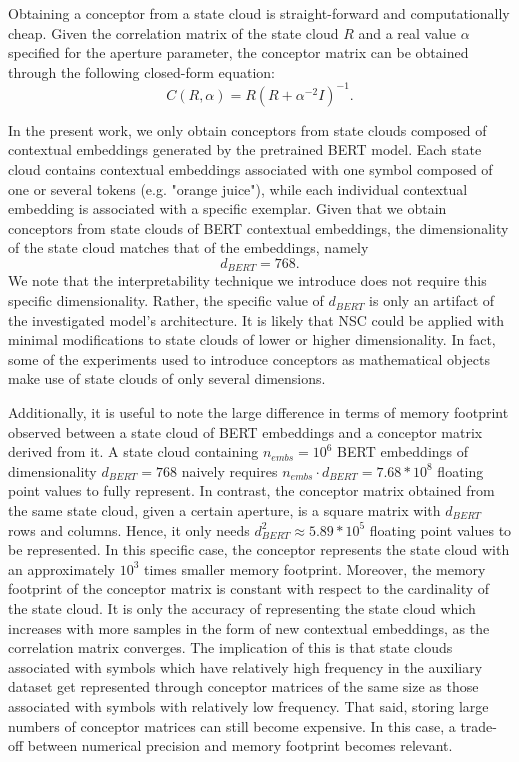 Obtaining a conceptor from a state cloud is straight-forward and computationally cheap. Given the correlation matrix of the state cloud $R$ and a real value $\alpha$ specified for the aperture parameter, the conceptor matrix can be obtained through the following closed-form equation:$$C(R, \alpha) = R (R + \alpha^{-2} I)^{-1}.$$

In the present work, we only obtain conceptors from state clouds composed of contextual embeddings generated by the pretrained BERT model. Each state cloud contains contextual embeddings associated with one symbol composed of one or several tokens (e.g. "orange juice"), while each individual contextual embedding is associated with a specific exemplar. Given that we obtain conceptors from state clouds of BERT contextual embeddings, the dimensionality of the state cloud matches that of the embeddings, namely $$d_{BERT}=768.$$ We note that the interpretability technique we introduce does not require this specific dimensionality. Rather, the specific value of $d_{BERT}$ is only an artifact of the investigated model's architecture. It is likely that NSC could be applied with minimal modifications to state clouds of lower or higher dimensionality. In fact, some of the experiments used to introduce conceptors as mathematical objects make use of state clouds of only several dimensions.

Additionally, it is useful to note the large difference in terms of memory footprint observed between a state cloud of BERT embeddings and a conceptor matrix derived from it. A state cloud containing $n_{embs} = 10^6$ BERT embeddings of dimensionality $d_{BERT}=768$ naively requires $n_{embs} \cdot d_{BERT} = 7.68 * 10^8$ floating point values to fully represent. In contrast, the conceptor matrix obtained from the same state cloud, given a certain aperture, is a square matrix with $d_{BERT}$ rows and columns. Hence, it only needs $d_{BERT}^2 \approx 5.89 * 10^5$ floating point values to be represented. In this specific case, the conceptor represents the state cloud with an approximately $10^3$ times smaller memory footprint. Moreover, the memory footprint of the conceptor matrix is constant with respect to the cardinality of the state cloud. It is only the accuracy of representing the state cloud which increases with more samples in the form of new contextual embeddings, as the correlation matrix converges. The implication of this is that state clouds associated with symbols which have relatively high frequency in the auxiliary dataset get represented through conceptor matrices of the same size as those associated with symbols with relatively low frequency. That said, storing large numbers of conceptor matrices can still become expensive. In this case, a trade-off between numerical precision and memory footprint becomes relevant.

